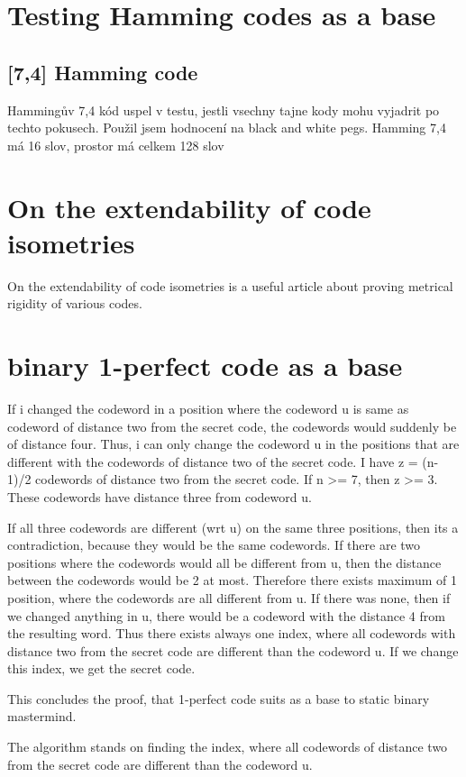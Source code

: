 \section{Testing Hamming codes as a base}
\subsection{[7,4] Hamming code}
Hammingův 7,4 kód uspel v testu, jestli vsechny tajne kody mohu vyjadrit po techto pokusech. 
Použil jsem hodnocení na black and white pegs.
Hamming 7,4 má 16 slov, prostor má celkem 128 slov


\section{On the extendability of code isometries}
On the extendability of code isometries is a useful article about proving metrical rigidity of various codes. 

\section{binary 1-perfect code as a base}
If i changed the codeword in a position where the codeword u is same as codeword of distance two from the secret code, the codewords would suddenly be of distance four. Thus, i can only change the codeword u in the positions that are different with the codewords of distance two of the secret code. I have z = (n-1)/2 codewords of distance two from the secret code. If n >= 7, then z >= 3. These codewords have distance three from codeword u. 

If all three codewords are different (wrt u) on the same three positions, then its a contradiction, because they would be the same codewords. If there are two positions where the codewords would all be different from u, then the distance between the codewords would be 2 at most. Therefore there exists maximum of 1 position, where the codewords are all different from u. If there was none, then if we changed anything in u, there would be a codeword with the distance 4 from the resulting word. Thus there exists always one index, where all codewords with distance two from the secret code are different than the codeword u. If we change this index, we get the secret code. 

This concludes the proof, that 1-perfect code suits as a base to static binary mastermind. 

The algorithm stands on finding the index, where all codewords of distance two from the secret code are different than the codeword u. 


